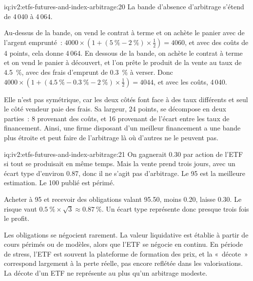 \begin{solution}{iq:iv2:etfs-futures-and-index-arbitrage:20}
La bande d'absence d'arbitrage s'étend de 4\,040 à 4\,064.

Au-dessus de la bande, on vend le contrat à terme et on achète le panier avec de l'argent emprunté~: $4000 \times (1 + (5~\% - 2~\%) \times \tfrac12) = 4060$, et avec des coûts de 4 points, cela donne 4\,064. En dessous de la bande, on achète le contrat à terme et on vend le panier à découvert, et l'on prête le produit de la vente au taux de 4.5~\%, avec des frais d'emprunt de 0.3~\% à verser. Donc $4000 \times (1 + (4.5~\% - 0.3~\% - 2~\%) \times \tfrac12) = 4044$, et avec les coûts, 4\,040.

Elle n'est pas symétrique, car les deux côtés font face à des taux différents et seul le côté vendeur paie des frais. Sa largeur, 24 points, se décompose en deux parties~: 8 provenant des coûts, et 16 provenant de l'écart entre les taux de financement. Ainsi, une firme disposant d'un meilleur financement a une bande plus étroite et peut faire de l'arbitrage là où d'autres ne le peuvent pas.

\end{solution}

\begin{solution}{iq:iv2:etfs-futures-and-index-arbitrage:21}
On gagnerait 0.30 par action de l'ETF si tout se produisait en même temps. Mais la vente prend trois jours, avec un écart type d'environ 0.87, donc il ne s'agit pas d'arbitrage. Le 95 est la meilleure estimation. Le 100 publié est périmé.

Acheter à 95 et recevoir des obligations valant 95.50, moins 0.20, laisse 0.30. Le risque vaut $0.5~\% \times \sqrt 3 \approx 0.87~\%$. Un écart type représente donc presque trois fois le profit.

Les obligations se négocient rarement. La valeur liquidative est établie à partir de cours périmés ou de modèles, alors que l'ETF se négocie en continu. En période de stress, l'ETF est souvent la plateforme de formation des prix, et la «~décote~» correspond largement à la perte réelle, pas encore reflétée dans les valorisations. La décote d'un ETF ne représente au plus qu'un arbitrage modeste.

\end{solution}

